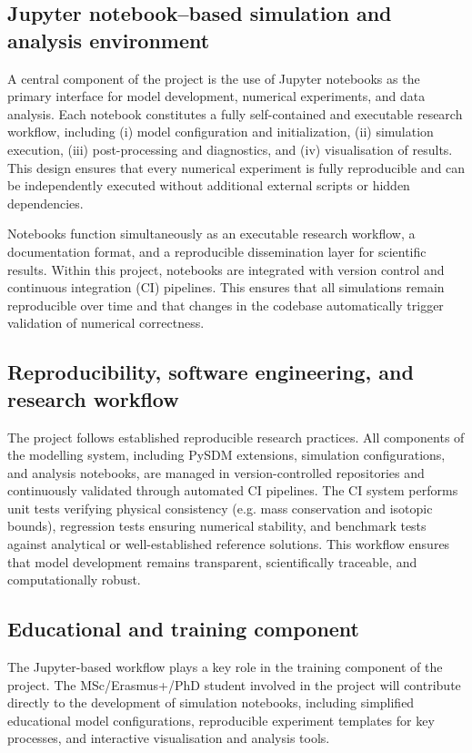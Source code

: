 \documentclass[12pt]{article}
\begin{document}
\subsection*{Jupyter notebook–based simulation and analysis environment}
A central component of the project is the use of Jupyter notebooks
as the primary interface for model development, numerical experiments,
and data analysis.
Each notebook constitutes a fully self-contained and executable
research workflow, including (i) model configuration and initialization,
(ii) simulation execution,
(iii) post-processing and diagnostics, and 
(iv) visualisation of results.
This design ensures that every numerical experiment is fully reproducible
and can be independently executed without additional external
scripts or hidden dependencies.

Notebooks function simultaneously as an executable research workflow, a documentation format,  
and a reproducible dissemination layer for scientific results.
Within this project, notebooks are integrated with version control
and continuous integration (CI) pipelines. 
This ensures that all simulations remain reproducible
over time and that changes in the codebase automatically trigger 
validation of numerical correctness.

\subsection*{Reproducibility, software engineering, and research workflow}
The project follows established reproducible research practices.
All components of the modelling system, including PySDM extensions,
simulation configurations, and analysis notebooks,
are managed in version-controlled repositories and continuously
validated through automated CI pipelines.
The CI system performs unit tests verifying physical consistency (e.g. mass conservation and isotopic bounds),
regression tests ensuring numerical stability,
and benchmark tests against analytical or well-established reference solutions.
This workflow ensures that model development remains transparent, 
scientifically traceable, and computationally robust.

\subsection*{Educational and training component}
The Jupyter-based workflow plays a key role in the training component
of the project.
The MSc/Erasmus+/PhD student involved in the project will
contribute directly to the development of simulation notebooks, including
simplified educational model configurations,
reproducible experiment templates for key processes,
and interactive visualisation and analysis tools.
\end{document}
